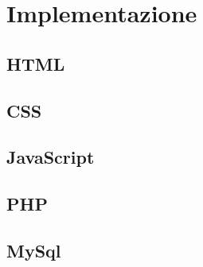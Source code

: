 \section{Implementazione}
	

  \subsection{HTML}


  \subsection{CSS}


  \subsection{JavaScript}


  \subsection{PHP}


  \subsection{MySql}